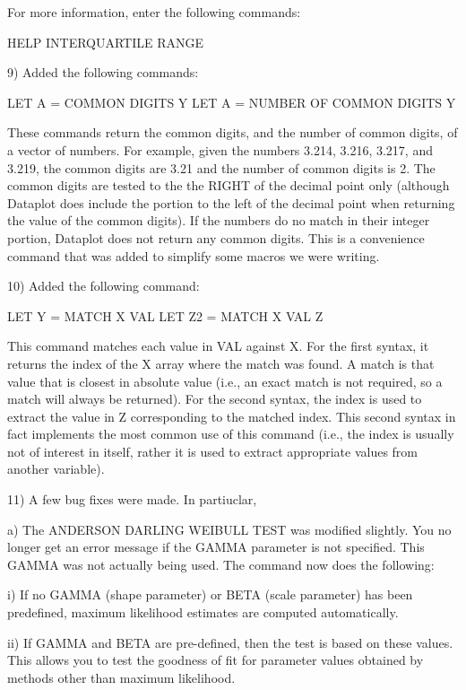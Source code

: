 {    For more information, enter the following commands:

        HELP INTERQUARTILE RANGE

 9) Added the following commands:

      LET A = COMMON DIGITS Y
      LET A = NUMBER OF COMMON DIGITS Y

    These commands return the common digits, and the number of
    common digits, of a vector of numbers.  For example, given
    the numbers 3.214, 3.216, 3.217, and 3.219, the common digits
    are 3.21 and the number of common digits is 2.  The common digits
    are tested to the the RIGHT of the decimal point only (although
    Dataplot does include the portion to the left of the decimal
    point when returning the value of the common digits).  If the
    numbers do no match in their integer portion, Dataplot does
    not return any common digits.  This is a convenience command
    that was added to simplify some macros we were writing.

10) Added the following command:

      LET Y = MATCH X VAL
      LET Z2 = MATCH X VAL Z

    This command matches each value in VAL against X.  For the
    first syntax, it returns the index of the X array where the
    match was found.  A match is that value that is closest in
    absolute value (i.e., an exact match is not required, so
    a match will always be returned).  For the second syntax,
    the index is used to extract the value in Z corresponding to
    the matched index.  This second syntax in fact implements the
    most common use of this command (i.e., the index is usually
    not of interest in itself, rather it is used to extract
    appropriate values from another variable).

11) A few bug fixes were made.  In partiuclar,

    a) The ANDERSON DARLING WEIBULL TEST was modified slightly.
       You no longer get an error message if the GAMMA parameter
       is not specified.  This GAMMA was not actually being used.
       The command now does the following:

        i) If no GAMMA (shape parameter) or BETA (scale parameter)
           has been predefined, maximum likelihood estimates are
           computed automatically.

       ii) If GAMMA and BETA are pre-defined, then the test is
           based on these values.  This allows you to test the goodness
           of fit for parameter values obtained by methods other than
           maximum likelihood.

}
